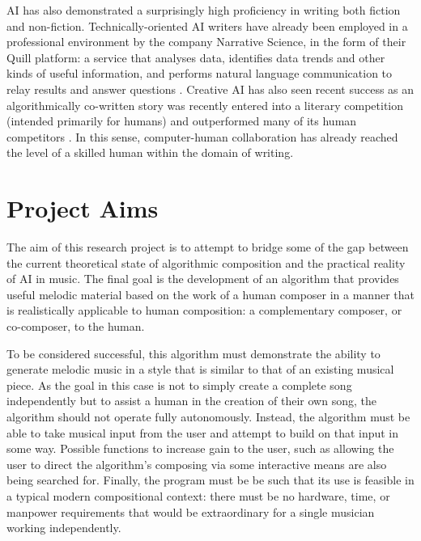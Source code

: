 \documentclass[ author={Stephen Livermore-Tozer},
				supervisor={Dr. Peter Flach},
				degree={MEng},
				title={Algorithmic Co-composition Using Machine Learning},
				subtitle={},
				type={research},
				year={2016} ]{dissertation}
\begin{document}
	AI has also demonstrated a surprisingly high proficiency in writing both fiction and non-fiction. Technically-oriented AI writers have already been employed in a professional environment by the company Narrative Science, in the form of their Quill platform: a service that analyses data, identifies data trends and other kinds of useful information, and performs natural language communication to relay results and answer questions \cite{woodie2016big}. Creative AI has also seen recent success as an algorithmically co-written story was recently entered into a literary competition (intended primarily for humans) and outperformed many of its human competitors \cite{tarantola2016ai}. In this sense, computer-human collaboration has already reached the level of a skilled human within the domain of writing. 
	
	\section{Project Aims}
	\label{sec:project-aims}
	
	The aim of this research project is to attempt to bridge some of the gap between the current theoretical state of algorithmic composition and the practical reality of AI in music. The final goal is the development of an algorithm that provides useful melodic material based on the work of a human composer in a manner that is realistically applicable to human composition: a complementary composer, or co-composer, to the human.
	
	To be considered successful, this algorithm must demonstrate the ability to generate melodic music in a style that is similar to that of an existing musical piece. As the goal in this case is not to simply create a complete song independently but to assist a human in the creation of their own song, the algorithm should not operate fully autonomously. Instead, the algorithm must be able to take musical input from the user and attempt to build on that input in some way. Possible functions to increase gain to the user, such as allowing the user to direct the algorithm's composing via some interactive means are also being searched for. Finally, the program must be be such that its use is feasible in a typical modern compositional context: there must be no hardware, time, or manpower requirements that would be extraordinary for a single musician working independently.
	
\end{document}
